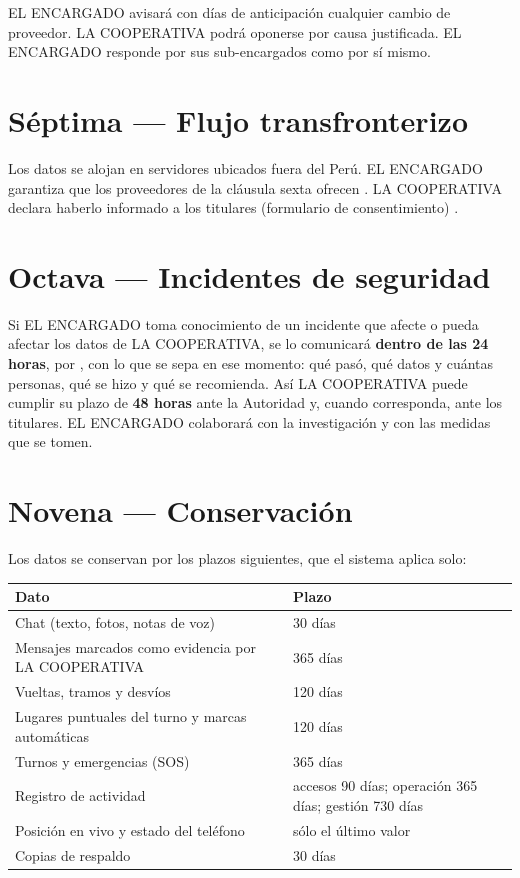 \documentclass[10.5pt,a4paper]{article}
\begin{document}
EL ENCARGADO avisará con  días de anticipación cualquier cambio
de proveedor. LA COOPERATIVA podrá oponerse por causa justificada. EL
ENCARGADO responde por sus sub-encargados como por sí mismo.

\section{Séptima — Flujo transfronterizo}
Los datos se alojan en servidores ubicados fuera del Perú. EL ENCARGADO
garantiza que los proveedores de la cláusula sexta ofrecen
. LA COOPERATIVA declara haberlo
informado a los titulares (formulario de consentimiento) .

\section{Octava — Incidentes de seguridad}
Si EL ENCARGADO toma conocimiento de un incidente que afecte o pueda afectar
los datos de LA COOPERATIVA, se lo comunicará \textbf{dentro de las 24 horas},
por , con lo que se sepa en ese momento: qué
pasó, qué datos y cuántas personas, qué se hizo y qué se recomienda. Así LA
COOPERATIVA puede cumplir su plazo de \textbf{48 horas} ante la Autoridad y,
cuando corresponda, ante los titulares. EL ENCARGADO colaborará con la
investigación y con las medidas que se tomen.

\section{Novena — Conservación}
Los datos se conservan por los plazos siguientes, que el sistema aplica solo:

\begin{tabularx}{\linewidth}{>{\raggedright}p{7.6cm}X}
\toprule
\textbf{Dato} & \textbf{Plazo}\\\midrule
Chat (texto, fotos, notas de voz) & 30 días\\
Mensajes marcados como evidencia por LA COOPERATIVA & 365 días\\
Vueltas, tramos y desvíos & 120 días\\
Lugares puntuales del turno y marcas automáticas & 120 días\\
Turnos y emergencias (SOS) & 365 días\\
Registro de actividad & accesos 90 días; operación 365 días; gestión 730 días\\
Posición en vivo y estado del teléfono & sólo el último valor\\
Copias de respaldo & 30 días\\
\bottomrule
\end{tabularx}
\end{document}
